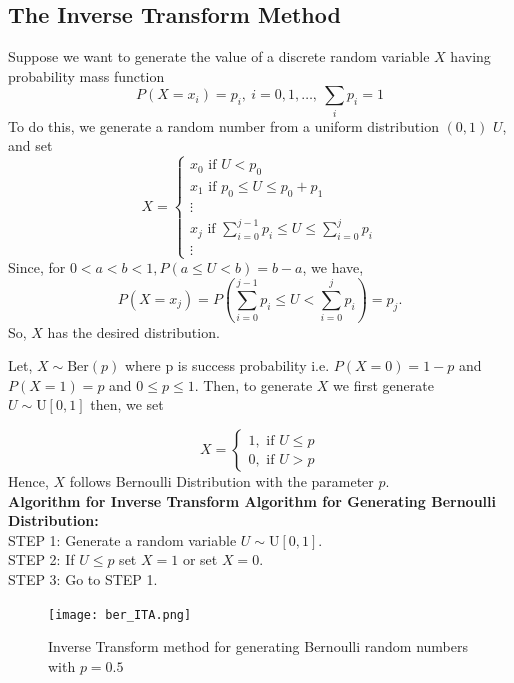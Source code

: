 \subsection{The Inverse Transform Method}
Suppose we want to generate the value of a discrete random variable $X$ having probability mass function
\[
	P(X=x_i)=p_i, \ i = 0,1, \ldots , \ \sum_ip_i =1
\]
To do this, we generate a random number from a uniform distribution $(0,1)$ $U$, and set
\[
	X=
	\begin{cases}
		x_0 \text{ if } U<p_0                                         \\
		x_1 \text{ if } p_0\le U\le p_0+p_1                           \\
		\vdots                                                        \\
		x_j \text{ if } \sum_{i=0}^{j-1}p_i\le U\le \sum_{i=0}^{j}p_i \\
		\vdots
	\end{cases}
\]
Since, for $0<a<b<1, P(a\le U<b) = b-a$, we have,
\[
	P(X=x_j)=P\left( \sum_{i=0}^{j-1}p_i\le U< \sum_{i=0}^{j}p_i \right) = p_j
	.\]
So, $X$ has the desired distribution.

\begin{example}
    Let, $X\sim \text{Ber}(p)$ where p is success probability  i.e.  $P(X=0)= 1-p$ and  $P(X=1)=p$ and $0\le p \le 1$.
    Then, to generate $X$ we first generate $U \sim \text{U}[0,1]$ then, we set

	\[
		X=
		\begin{cases}
			1, \text{ if } U\le p \\
			0, \text{ if } U> p
		\end{cases}
	\]
	Hence, $X$ follows Bernoulli Distribution with the parameter $p$.\\
	\textbf{Algorithm for Inverse Transform Algorithm for Generating Bernoulli Distribution:}\\
    STEP 1: Generate a random variable $U\sim \text{U}[0,1]$.\\
	STEP 2: If $U\le p$ set $X=1$ or set  $X=0$. \\
	STEP 3: Go to  STEP 1.

	\begin{figure}[H]
		\centering
		\texttt{[image: ber\_ITA.png]}
		\caption{Inverse Transform method for generating  Bernoulli random numbers with $p=0.5$}
	\end{figure}
\end{example}

